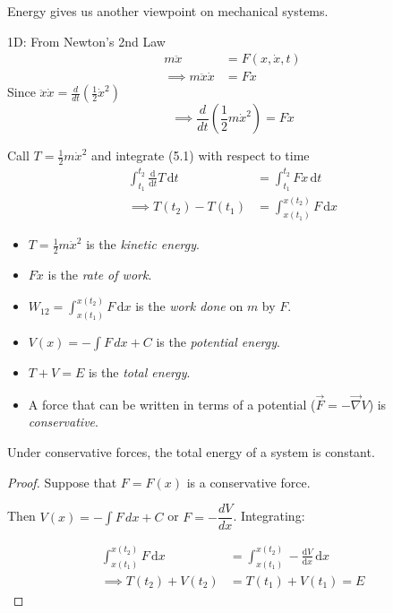 \documentclass[twoside]{scrartcl}
\begin{document}
 
  
  
  




Energy  gives us another viewpoint on mechanical systems. 

1D: From Newton's 2nd Law
\[\begin{aligned}
m\ddot{x} &= F(x,\dot{x},t)\\
 \implies m\ddot{x}\dot{x} &= F\dot{x}
\end{aligned}\]
Since $\ddot{x}\dot{x} = \frac{d}{dt}\left(\frac{1}{2}\dot{x}^2\right)$ \begin{equation}\implies \boxed{ \frac{d}{dt}\left(\frac{1}{2}m\dot{x}^2\right) = F\dot{x}}\end{equation}


Call $T = \frac{1}{2}m\dot{x}^2$ and integrate (5.1) with respect to time
\[\begin{aligned}\int_{t_1}^{t_2}\frac{\mathrm{d}}{\mathrm{d}t}T\,\mathrm{d}t &= \int_{t_1}^{t_2}F\dot{x}\,\mathrm{d}t\\ 
\implies T(t_2) - T(t_1) &= \int_{x(t_1)}^{x(t_2)}F\,\mathrm{d}x	
\end{aligned}
\]

\begin{definition}
\begin{itemize}
\item $T = \frac{1}{2}m\dot{x}^2$ is the \emph{kinetic energy}.
\item  $F\dot{x}$ is the \emph{rate of work}.	
\item $\displaystyle{W_{12} = \int_{x(t_1)}^{x(t_2)}F\,\mathrm{d}x	}$ is the \emph{work done} on $m$ by $F$.
\item $\displaystyle{V(x) = -\int F\,dx + C}$ is the \emph{potential energy}.
\item $T + V = E$ is the \emph{total energy}. 
\item A force that can be written in terms of a potential ($\vec{F} = -\vec{\nabla}V$) is \emph{conservative}.
\end{itemize}
\end{definition}


\begin{theorem}
Under conservative forces, the total energy of a system is constant.
\end{theorem}
\begin{proof}

Suppose that $F = F(x)$ is a conservative force. 

Then $V(x) = -\int F\,dx + C$ or $F = -\dfrac{dV}{dx}$. Integrating:

\[\begin{aligned}  \int_{x(t_1)}^{x(t_2)}F\,\mathrm{d}x	 &= \int_{x(t_1)}^{x(t_2)} - \frac{\mathrm{d}V}{\mathrm{d}x}\,\mathrm{d}x\\[0.1cm]
\implies T(t_2) + V(t_2) &= T(t_1) + V(t_1) = E
\end{aligned}
\] \end{proof}
\end{document}
